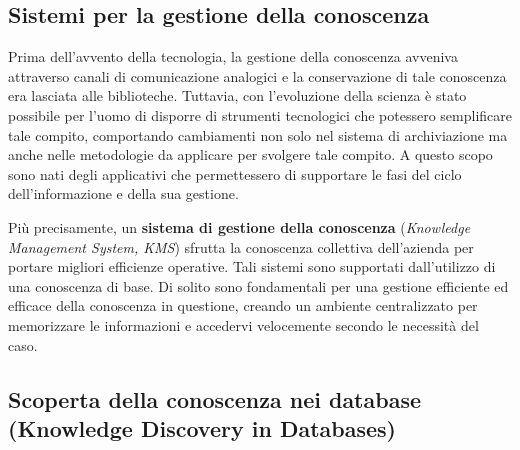 \subsection{Sistemi per la gestione della conoscenza}

Prima dell'avvento della tecnologia, la gestione della conoscenza avveniva attraverso canali di comunicazione analogici e la conservazione di tale conoscenza era lasciata alle biblioteche. Tuttavia, con l'evoluzione della scienza è stato possibile per l'uomo di disporre di strumenti tecnologici che potessero semplificare tale compito, comportando cambiamenti non solo nel sistema di archiviazione ma anche nelle metodologie da applicare per svolgere tale compito. A questo scopo sono nati degli applicativi che permettessero di supportare le fasi del ciclo dell'informazione e della sua gestione.

Più precisamente, un \textbf{sistema di gestione della conoscenza} (\textit{Knowledge Management System, KMS}) sfrutta la conoscenza collettiva dell'azienda per portare migliori efficienze operative. Tali sistemi sono supportati dall'utilizzo di una conoscenza di base. Di solito sono fondamentali per una gestione efficiente ed efficace della conoscenza in questione, creando un ambiente centralizzato per memorizzare le informazioni e accedervi velocemente secondo le necessità del caso.\cite{ibm_knowledge_management}

\subsection{Scoperta della conoscenza nei database (Knowledge Discovery in Databases)}

